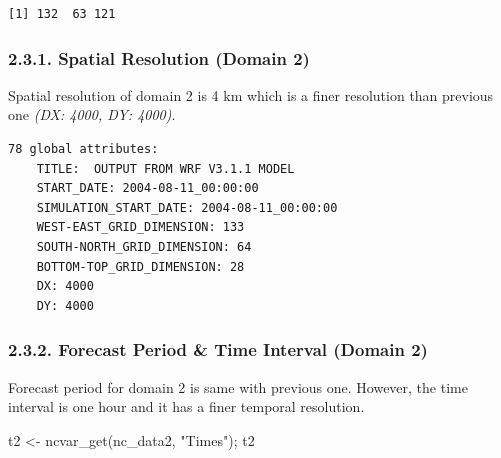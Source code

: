 \documentclass[
  letterpaper,
  DIV=11,
  numbers=noendperiod,
  abstract]{scrartcl}
\newenvironment{Shaded}{\begin{snugshade}}{\end{snugshade}}
\newcommand{\FunctionTok}[1]{\textcolor[rgb]{0.28,0.35,0.67}{#1}}
\newcommand{\NormalTok}[1]{\textcolor[rgb]{0.00,0.23,0.31}{#1}}
\newcommand{\OtherTok}[1]{\textcolor[rgb]{0.00,0.23,0.31}{#1}}
\newcommand{\StringTok}[1]{\textcolor[rgb]{0.13,0.47,0.30}{#1}}
\begin{document}
\begin{verbatim}
[1] 132  63 121
\end{verbatim}

\hypertarget{spatial-resolution-domain-2}{%
\subsubsection{2.3.1. Spatial Resolution (Domain
2)}\label{spatial-resolution-domain-2}}

Spatial resolution of domain 2 is 4 km which is a finer resolution than
previous one \emph{(DX: 4000, DY: 4000)}.

\begin{verbatim}
78 global attributes:
    TITLE:  OUTPUT FROM WRF V3.1.1 MODEL
    START_DATE: 2004-08-11_00:00:00
    SIMULATION_START_DATE: 2004-08-11_00:00:00
    WEST-EAST_GRID_DIMENSION: 133
    SOUTH-NORTH_GRID_DIMENSION: 64
    BOTTOM-TOP_GRID_DIMENSION: 28
    DX: 4000
    DY: 4000
\end{verbatim}

\hypertarget{forecast-period-time-interval-domain-2}{%
\subsubsection{2.3.2. Forecast Period \& Time Interval (Domain
2)}\label{forecast-period-time-interval-domain-2}}

Forecast period for domain 2 is same with previous one. However, the
time interval is one hour and it has a finer temporal resolution.

\begin{Shaded}
\begin{Highlighting}[]
\NormalTok{t2 }\OtherTok{\textless{}{-}} \FunctionTok{ncvar\_get}\NormalTok{(nc\_data2, }\StringTok{"Times"}\NormalTok{); t2}
\end{Highlighting}
\end{Shaded}
\end{document}
